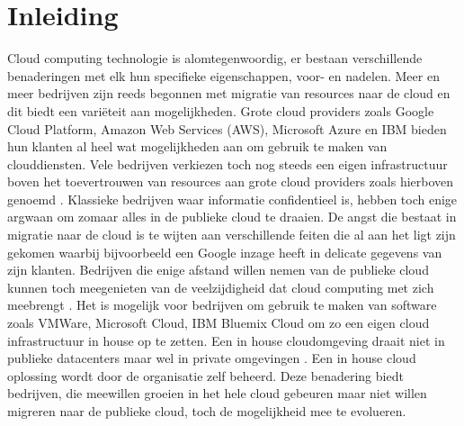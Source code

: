 
\chapter{Inleiding}
\label{ch:inleiding}

Cloud computing technologie is alomtegenwoordig, er bestaan verschillende benaderingen met elk hun specifieke eigenschappen, voor- en nadelen. Meer en meer bedrijven zijn reeds begonnen met migratie van resources naar de cloud en dit biedt een variëteit aan mogelijkheden. Grote cloud providers zoals Google Cloud Platform, Amazon Web Services (AWS), Microsoft Azure en IBM bieden hun klanten al heel wat mogelijkheden aan om gebruik te maken van clouddiensten. Vele bedrijven verkiezen toch nog steeds een eigen infrastructuur boven het toevertrouwen van resources aan grote cloud providers zoals hierboven genoemd . Klassieke bedrijven waar informatie confidentieel is, hebben toch enige argwaan om zomaar alles in de publieke cloud te draaien. De angst die bestaat in migratie naar de cloud is te wijten aan verschillende feiten die al aan het ligt zijn gekomen waarbij bijvoorbeeld een Google inzage heeft in delicate gegevens van zijn klanten. Bedrijven die enige afstand willen nemen van de publieke cloud kunnen toch meegenieten van de veelzijdigheid dat cloud computing met zich meebrengt . Het is mogelijk voor bedrijven om gebruik te maken van software zoals VMWare, Microsoft Cloud, IBM Bluemix Cloud om zo een eigen cloud infrastructuur in house op te zetten. Een in house cloudomgeving draait niet in publieke datacenters maar wel in private omgevingen . Een in house cloud oplossing wordt door de organisatie zelf beheerd. Deze benadering biedt bedrijven, die meewillen groeien in het hele cloud gebeuren maar niet willen migreren naar de publieke cloud, toch de mogelijkheid mee te evolueren.
\\\\

